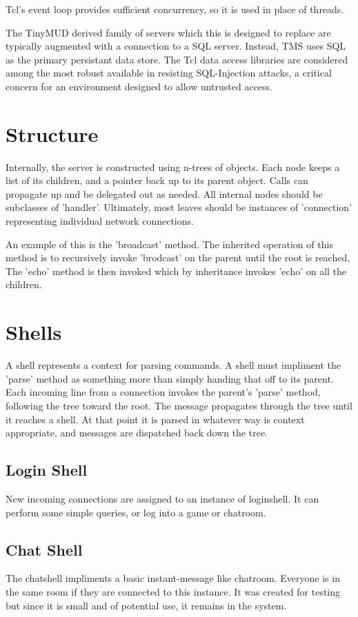 \documentclass[10pt,letterpaper,twoside]{book}
\begin{document}
Tcl's event loop provides sufficient concurrency, so it is used in place of threads.

The TinyMUD derived family of servers which this is designed to replace are typically augmented with a connection to a SQL server.
Instead, TMS uses SQL as the primary persistant data store.
The Tcl data access libraries are considered among the most robust available in resisting SQL-Injection attacks,
a critical concern for an environment designed to allow untrusted access.
\chapter{Structure}
Internally, the server is constructed using n-trees of objects.
Each node keeps a list of its children, and a pointer back up to its parent object.
Calls can propagate up and be delegated out as needed.
All internal nodes should be subclasses of 'handler'.
Ultimately, most leaves should be instances of 'connection' representing individual network connections.

An example of this is the 'broadcast' method.
The inherited operation of this method is to recursively invoke 'brodcast' on the parent until the root is reached,
The 'echo' method is then invoked which by inheritance invokes 'echo' on all the children.
\chapter{Shells}
A shell represents a context for parsing commands.
A shell must impliment the 'parse' method as something more than simply handing that off to its parent.
Each incoming line from a connection invokes the parent's 'parse' method, following the tree toward the root.
The message propagates through the tree until it reaches a shell.
At that point it is parsed in whatever way is context appropriate, and messages are dispatched back down the tree.
\section{Login Shell}
New incoming connections are assigned to an instance of loginshell.
It can perform some simple queries, or log into a game or chatroom.
\section{Chat Shell}
The chatshell impliments a basic instant-message like chatroom.
Everyone is in the same room if they are connected to this instance.
It was created for testing but since it is small and of potential use, it remains in the system.
\end{document}
